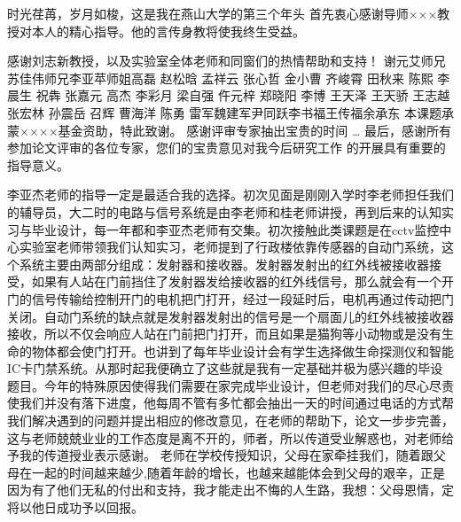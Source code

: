 \makeatletter
{}
  \pagestyle{fancy}%
  \fancyhf{}
\makeatother

\begin{thanks}
时光荏苒，岁月如梭，这是我在燕山大学的第三个年头
首先衷心感谢导师×××教授对本人的精心指导。他的言传身教将使我终生受益。

感谢刘志新教授，以及实验室全体老师和同窗们的热情帮助和支持！ 
 谢元艾师兄苏佳伟师兄李亚苹师姐高磊 赵松晗 孟祥云 张心哲 金小曹 齐峻霄 田秋来 陈熙 李晨生 祝犇 张嘉元 高杰 李彩月 梁自强 仵元梓 
 郑晓阳
 李博 王天泽 王天骄 王志越 张宏林 孙震岳 召辉 曹海洋 陈勇
 雷军魏建军尹同跃李书福王传福余承东
本课题承蒙××××基金资助，特此致谢。
感谢评审专家抽出宝贵的时间
…
最后，感谢所有参加论文评审的各位专家，您们的宝贵意见对我今后研究工作
的开展具有重要的指导意义。

李亚杰老师的指导一定是最适合我的选择。初次见面是刚刚入学时李老师担任我们的辅导员，大二时的电路与信号系统是由李老师和桂老师讲授，再到后来的认知实习与毕业设计，每一年都和李亚杰老师有交集。初次接触此类课题是在cctv监控中心实验室老师带领我们认知实习，老师提到了行政楼依靠传感器的自动门系统，这个系统主要由两部分组成：发射器和接收器。发射器发射出的红外线被接收器接受，如果有人站在门前挡住了发射器发给接收器的红外线信号，那么就会有一个开门的信号传输给控制开门的电机把门打开，经过一段延时后，电机再通过传动把门关闭。自动门系统的缺点就是发射器发射出的信号是一个扇面儿的红外线被接收器接收，所以不仅会响应人站在门前把门打开，而且如果是猫狗等小动物或是没有生命的物体都会使门打开。也讲到了每年毕业设计会有学生选择做生命探测仪和智能IC卡门禁系统。从那时起我便确立了这些就是我有一定基础并极为感兴趣的毕设题目。今年的特殊原因使得我们需要在家完成毕业设计，但老师对我们的尽心尽责使我们并没有落下进度，他每周不管有多忙都会抽出一天的时间通过电话的方式帮我们解决遇到的问题并提出相应的修改意见，在老师的帮助下，论文一步步完善，这与老师兢兢业业的工作态度是离不开的，师者，所以传道受业解惑也，对老师给予我的传道授业表示感谢。
老师在学校传授知识，父母在家牵挂我们，随着跟父母在一起的时间越来越少,随着年龄的增长，也越来越能体会到父母的艰辛，正是因为有了他们无私的付出和支持，我才能走出不悔的人生路，我想：父母恩情，定将以他日成功予以回报。

\end{thanks}
